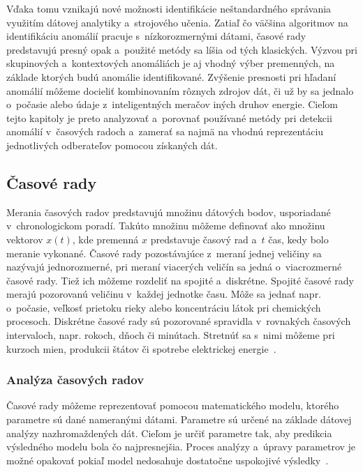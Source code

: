 \documentclass[a4paper,twoside,slovak,12pt,appendix]{article}
\begin{document}
Vďaka tomu vznikajú nové možnosti identifikácie neštandardného správania
využitím dátovej analytiky a~strojového učenia. Zatiaľ čo väčšina algoritmov na
identifikáciu anomálií pracuje s~nízkorozmernými dátami, časové rady predstavujú
presný opak a~použité metódy sa líšia od tých klasických. Výzvou pri skupinových
a~kontextových anomáliách je aj vhodný výber premenných, na základe ktorých budú
anomálie identifikované. Zvýšenie presnosti pri hľadaní anomálií môžeme docieliť
kombinovaním rôznych zdrojov dát, či už by sa jednalo o~počasie alebo údaje
z~inteligentných meračov iných druhov energie. Cieľom tejto kapitoly je preto
analyzovať a~porovnať používané metódy pri detekcii anomálií v~časových radoch
a~zamerať sa najmä na vhodnú reprezentáciu jednotlivých odberateľov pomocou
získaných dát.


\subsection{Časové rady}
Merania časových radov predstavujú množinu dátových bodov, usporiadané
v~chronologickom poradí. Takúto množinu môžeme definovať ako množinu vektorov
$x(t)$, kde premenná $x$ predstavuje časový rad a~$t$ čas, kedy bolo meranie
vykonané. Časové rady pozostávajúce z~meraní jednej veličiny sa nazývajú
jednorozmerné, pri meraní viacerých veličín sa jedná o~viacrozmerné časové rady.
Tiež ich môžeme rozdeliť na spojité a~diskrétne. Spojité časové rady merajú
pozorovanú veličinu v~každej jednotke času. Môže sa jednať napr. o~počasie,
veľkosť prietoku rieky alebo koncentráciu látok pri chemických procesoch.
Diskrétne časové rady sú pozorované spravidla v~rovnakých časových intervaloch,
napr. rokoch, dňoch či minútach. Stretnúť sa s~nimi môžeme pri kurzoch mien,
produkcii štátov či spotrebe elektrickej energie~\cite{Agrawal2013}.


\subsubsection{Analýza časových radov}
Časové rady môžeme reprezentovať pomocou matematického modelu, ktorého parametre
sú dané nameranými dátami. Parametre sú určené na základe dátovej analýzy
nazhromaždených dát. Cieľom je určiť parametre tak, aby predikcia výsledného
modelu bola čo najpresnejšia. Proces analýzy a~úpravy parametrov je možné
opakovať pokiaľ model nedosahuje dostatočne uspokojivé
výsledky~\cite{Agrawal2013}.
\end{document}
